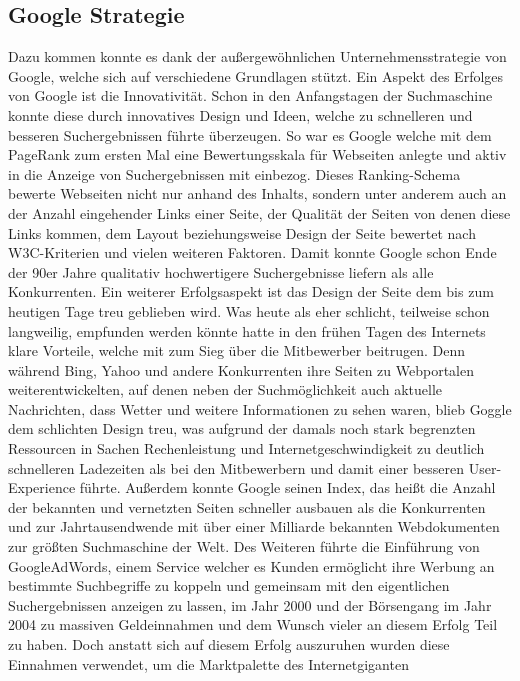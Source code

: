 \subsection{Google Strategie}\label{subsec:google-strategie}
Dazu kommen konnte es dank der außergewöhnlichen Unternehmensstrategie von Google, welche sich auf verschiedene Grundlagen
stützt.
Ein Aspekt des Erfolges von Google ist die Innovativität.
Schon in den Anfangstagen der Suchmaschine konnte diese durch innovatives Design und Ideen, welche zu schnelleren und
besseren Suchergebnissen führte überzeugen.
So war es Google welche mit dem PageRank zum ersten Mal eine Bewertungsskala für Webseiten anlegte und aktiv in die
Anzeige von Suchergebnissen mit einbezog.
Dieses Ranking-Schema bewerte Webseiten nicht nur anhand des Inhalts, sondern unter anderem auch an der Anzahl
eingehender Links einer Seite, der Qualität der Seiten von denen diese Links kommen, dem Layout beziehungsweise Design
der Seite bewertet nach W3C-Kriterien und vielen weiteren Faktoren.
Damit konnte Google schon Ende der 90er Jahre qualitativ hochwertigere Suchergebnisse liefern als alle Konkurrenten.
Ein weiterer Erfolgsaspekt ist das Design der Seite dem bis zum heutigen Tage treu geblieben wird.
Was heute als eher schlicht, teilweise schon langweilig, empfunden werden könnte hatte in den frühen Tagen des Internets
klare Vorteile, welche mit zum Sieg über die Mitbewerber beitrugen.
Denn während Bing, Yahoo und andere Konkurrenten ihre Seiten zu Webportalen weiterentwickelten, auf denen neben der
Suchmöglichkeit auch aktuelle Nachrichten, dass Wetter und weitere Informationen zu sehen waren, blieb Goggle dem schlichten
Design treu, was aufgrund der damals noch stark begrenzten Ressourcen in Sachen Rechenleistung und Internetgeschwindigkeit
zu deutlich schnelleren Ladezeiten als bei den Mitbewerbern und damit einer besseren User-Experience führte.
Außerdem konnte Google seinen Index, das heißt die Anzahl der bekannten und vernetzten Seiten schneller ausbauen als die
Konkurrenten und zur Jahrtausendwende mit über einer Milliarde bekannten Webdokumenten zur größten Suchmaschine der Welt.
Des Weiteren führte die Einführung von GoogleAdWords, einem Service welcher es Kunden ermöglicht ihre Werbung an
bestimmte Suchbegriffe zu koppeln und gemeinsam mit den eigentlichen Suchergebnissen anzeigen zu lassen, im Jahr 2000 und
der Börsengang im Jahr 2004 zu massiven Geldeinnahmen und dem Wunsch vieler an diesem Erfolg Teil zu haben.
Doch anstatt sich auf diesem Erfolg auszuruhen wurden diese Einnahmen verwendet, um die Marktpalette des Internetgiganten
